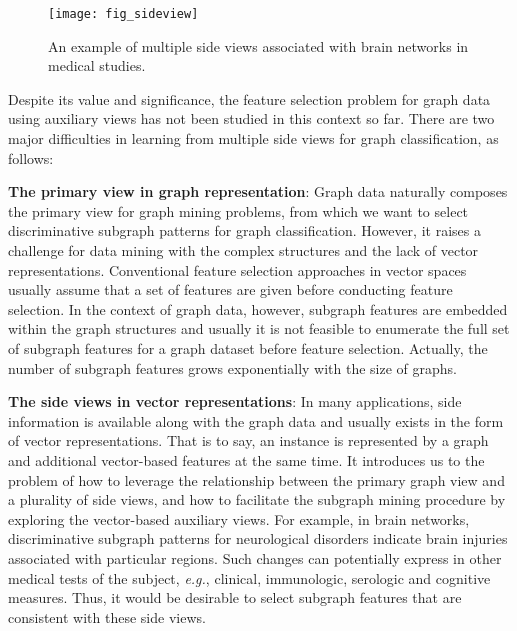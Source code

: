 \documentclass[conference]{IEEEtran}
\begin{document}
\begin{figure}[t]
\centering
    \begin{minipage}[l]{\columnwidth}
      \centering
      \texttt{[image: fig\_sideview]}
    \end{minipage}
  \caption{An example of multiple side views associated with brain networks in medical studies.}\label{fig:sideview}%
\end{figure}

Despite its value and significance, the feature selection problem for graph data using auxiliary views has not been studied in this context so far. There are two major difficulties in learning from multiple side views for graph classification, as follows:

\noindent\textbf{The primary view in graph representation}: Graph data naturally composes the primary view for graph mining problems, from which we want to select discriminative subgraph patterns for graph classification. However, it raises a challenge for data mining with the complex structures and the lack of vector representations. Conventional feature selection approaches in vector spaces usually assume that a set of features are given before conducting feature selection. In the context of graph data, however, subgraph features are embedded within the graph structures and usually it is not feasible to enumerate the full set of subgraph features for a graph dataset before feature selection. Actually, the number of subgraph features grows exponentially with the size of graphs.

\noindent\textbf{The side views in vector representations}: In many applications, side information is available along with the graph data and usually exists in the form of vector representations. That is to say, an instance is represented by a graph and additional vector-based features at the same time. It introduces us to the problem of how to leverage the relationship between the primary graph view and a plurality of side views, and how to facilitate the subgraph mining procedure by exploring the vector-based auxiliary views. For example, in brain networks, discriminative subgraph patterns for neurological disorders indicate brain injuries associated with particular regions. Such changes can potentially express in other medical tests of the subject, \emph{e.g.}, clinical, immunologic, serologic and cognitive measures. Thus, it would be desirable to select subgraph features that are consistent with these side views.
\end{document}
